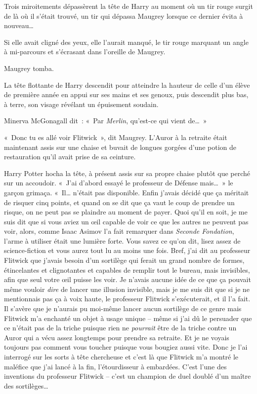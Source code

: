 Trois miroitements dépassèrent la tête de Harry au moment où un tir rouge surgit de là où il s'était trouvé, un tir qui dépassa Maugrey lorsque ce dernier évita à nouveau…

Si elle avait cligné des yeux, elle l'aurait manqué, le tir rouge marquant un angle à mi-parcours et s'écrasant dans l'oreille de Maugrey.

Maugrey tomba.

La tête flottante de Harry descendit pour atteindre la hauteur de celle d'un élève de première année en appui sur ses mains et ses genoux, puis descendit plus bas, à terre, son visage révélant un épuisement soudain.

Minerva McGonagall dit~: «~Par \emph{Merlin}, qu'est-ce qui vient de…~»

\later

«~Donc tu es allé voir Flitwick~», dit Maugrey. L'Auror à la retraite était maintenant assis sur une chaise et buvait de longues gorgées d'une potion de restauration qu'il avait prise de sa ceinture.

Harry Potter hocha la tête, à présent assis sur sa propre chaise plutôt que perché sur un accoudoir. «~J'ai d'abord essayé le professeur de Défense mais…~» le garçon grimaça. «~Il… n'était pas disponible. Enfin j'avais décidé que ça méritait de risquer cinq points, et quand on se dit que ça vaut le coup de prendre un risque, on ne peut pas se plaindre au moment de payer. Quoi qu'il en soit, je me suis dit que si vous aviez un œil capable de voir ce que les autres ne peuvent pas voir, alors, comme Isaac Asimov l'a fait remarquer dans \emph{Seconde Fondation}, l'arme à utiliser était une lumière forte. Vous savez ce qu'on dit, lisez assez de science-fiction et vous aurez tout lu au moins une fois. Bref, j'ai dit au professeur Flitwick que j'avais besoin d'un sortilège qui ferait un grand nombre de formes, étincelantes et clignotantes et capables de remplir tout le bureau, mais invisibles, afin que seul votre œil puisse les voir. Je n'avais aucune idée de ce que ça pouvait même vouloir \emph{dire} de lancer une illusion invisible, mais je me suis dit que si je ne mentionnais pas ça à voix haute, le professeur Flitwick s'exécuterait, et il l'a fait. Il s'avère que je n'aurais pu moi-même lancer aucun sortilège de ce genre mais Flitwick m'a enchanté un objet à usage unique -- même si j'ai dû le persuader que ce n'était pas de la triche puisque rien ne \emph{pourrait} être de la triche contre un Auror qui a vécu assez longtemps pour prendre sa retraite. Et je ne voyais toujours pas comment vous toucher puisque vous bougiez aussi vite. Donc je l'ai interrogé sur les sorts à tête chercheuse et c'est là que Flitwick m'a montré le maléfice que j'ai lancé à la fin, l'étourdisseur à embardées. C'est l'une des inventions du professeur Flitwick -- c'est un champion de duel doublé d'un maître des sortilèges…

